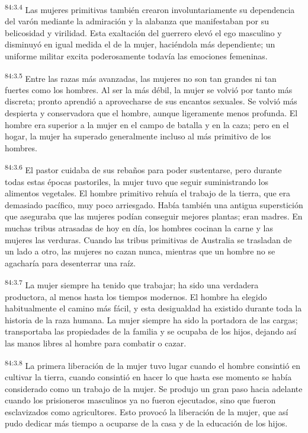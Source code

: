 \par
\textsuperscript{84:3.4} Las mujeres primitivas también crearon involuntariamente su dependencia del varón mediante la admiración y la alabanza que manifestaban por su belicosidad y virilidad. Esta exaltación del guerrero elevó el ego masculino y disminuyó en igual medida el de la mujer, haciéndola más dependiente; un uniforme militar excita poderosamente todavía las emociones femeninas.

\par
\textsuperscript{84:3.5} Entre las razas más avanzadas, las mujeres no son tan grandes ni tan fuertes como los hombres. Al ser la más débil, la mujer se volvió por tanto más discreta; pronto aprendió a aprovecharse de sus encantos sexuales. Se volvió más despierta y conservadora que el hombre, aunque ligeramente menos profunda. El hombre era superior a la mujer en el campo de batalla y en la caza; pero en el hogar, la mujer ha superado generalmente incluso al más primitivo de los hombres.

\par
\textsuperscript{84:3.6} El pastor cuidaba de sus rebaños para poder sustentarse, pero durante todas estas épocas pastoriles, la mujer tuvo que seguir suministrando los alimentos vegetales. El hombre primitivo rehuía el trabajo de la tierra, que era demasiado pacífico, muy poco arriesgado. Había también una antigua superstición que aseguraba que las mujeres podían conseguir mejores plantas; eran madres. En muchas tribus atrasadas de hoy en día, los hombres cocinan la carne y las mujeres las verduras. Cuando las tribus primitivas de Australia se trasladan de un lado a otro, las mujeres no cazan nunca, mientras que un hombre no se agacharía para desenterrar una raíz.

\par
\textsuperscript{84:3.7} La mujer siempre ha tenido que trabajar; ha sido una verdadera productora, al menos hasta los tiempos modernos. El hombre ha elegido habitualmente el camino más fácil, y esta desigualdad ha existido durante toda la historia de la raza humana. La mujer siempre ha sido la portadora de las cargas; transportaba las propiedades de la familia y se ocupaba de los hijos, dejando así las manos libres al hombre para combatir o cazar.

\par
\textsuperscript{84:3.8} La primera liberación de la mujer tuvo lugar cuando el hombre consintió en cultivar la tierra, cuando consintió en hacer lo que hasta ese momento se había considerado como un trabajo de la mujer. Se produjo un gran paso hacia adelante cuando los prisioneros masculinos ya no fueron ejecutados, sino que fueron esclavizados como agricultores. Esto provocó la liberación de la mujer, que así pudo dedicar más tiempo a ocuparse de la casa y de la educación de los hijos.

